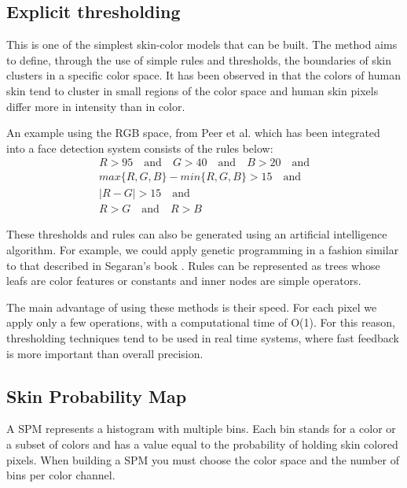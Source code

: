 \documentclass[12pt]{report}
\begin{document}
	\subsection{Explicit thresholding}
	This is one of the simplest skin-color models that can be built. The method aims to define, through the use of simple rules and thresholds, the boundaries of skin clusters in a specific color space. It has been observed in \cite{threshold_cluster} that the colors of human skin tend to cluster in small regions of the color space and human skin pixels differ more in intensity than in color.
	
	An example using the RGB space, from Peer et al.\cite{rgb_threshold} which has been integrated into a face detection system consists of the rules below:
	\begin{equation}
	\begin{split}
	R > 95 \quad \textrm{and} \quad G > 40 \quad \textrm{and} \quad B > 20 \quad \textrm{and} \\ 
	max\{R, G, B\} - min\{R, G, B\} > 15 \quad \textrm{and}\\
	|R - G| > 15 \quad \textrm{and}\\
	R > G \quad \textrm{and} \quad R > B
	\end{split}
	\end{equation}
	
	These thresholds and rules can also be generated using an artificial intelligence algorithm. For example, we could apply genetic programming in a fashion similar to that described in Segaran's book \cite{programming_collective_intelligence}. Rules can be represented as trees whose leafs are color features or constants and inner nodes are simple operators.
	
	The main advantage of using these methods is their speed. For each pixel we apply only a few operations, with a computational time of O(1). For this reason, thresholding techniques tend to be used in real time systems, where fast feedback is more important than overall precision.
	
	\subsection{Skin Probability Map}
	A SPM represents a histogram with multiple bins. Each bin stands for a color or a subset of colors and has a value equal to the probability of holding skin colored pixels. When building a SPM you must choose the color space and the number of bins per color channel.
	
\end{document}

